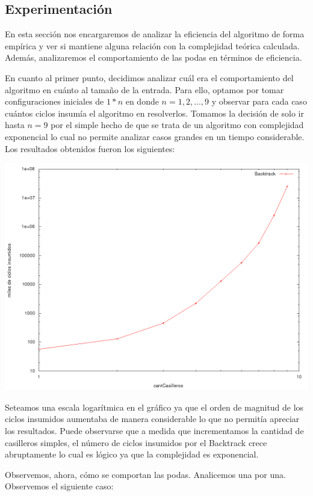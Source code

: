 \subsection{Experimentación}

En esta sección nos encargaremos de analizar la eficiencia del algoritmo de forma empírica y ver si mantiene alguna relación con la complejidad teórica calculada. Además, analizaremos el comportamiento de las podas en términos de eficiencia.

En cuanto al primer punto, decidimos analizar cuál era el comportamiento del algoritmo en cuánto al tamaño de la entrada. Para ello, optamos por tomar configuraciones iniciales de $1*n$ en donde $n=1,2,...,9$ y observar para cada caso cuántos ciclos insumía el algoritmo en resolverlos. Tomamos la decisión de solo ir hasta $n=9$ por el simple hecho de que se trata de un algoritmo con complejidad exponencial lo cual no permite analizar casos grandes en un tiempo considerable. Los resultados obtenidos fueron los siguientes:

\includegraphics[scale=0.3]{ej3/imgs/ej3-1.png}

Seteamos una escala logarítmica en el gráfico ya que el orden de magnitud de los ciclos insumidos aumentaba de manera considerable lo que no permitía apreciar los resultados. Puede observarse que a medida que incrementamos la cantidad de casilleros simples, el número de ciclos insumidos por el Backtrack crece abruptamente lo cual es lógico ya que la complejidad es exponencial.

Observemos, ahora, cómo se comportan las podas. Analicemos una por una. Observemos el siguiente caso:

